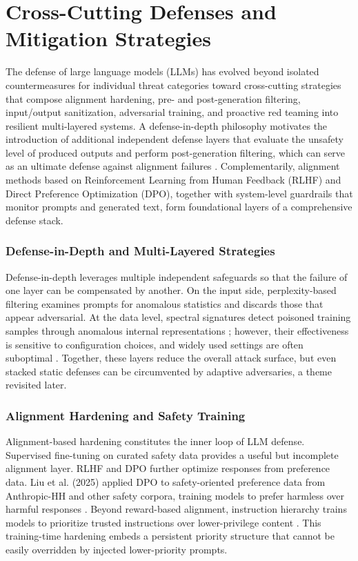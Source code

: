 \documentclass[11pt,a4paper]{article}
\begin{document}
\section{Cross-Cutting Defenses and Mitigation Strategies}

The defense of large language models (LLMs) has evolved beyond isolated countermeasures for individual threat categories toward cross-cutting strategies that compose alignment hardening, pre- and post-generation filtering, input/output sanitization, adversarial training, and proactive red teaming into resilient multi-layered systems. A defense-in-depth philosophy motivates the introduction of additional independent defense layers that evaluate the unsafety level of produced outputs and perform post-generation filtering, which can serve as an ultimate defense against alignment failures \cite{Arazzi_2026_Securebreak_0e3adcf7}. Complementarily, alignment methods based on Reinforcement Learning from Human Feedback (RLHF) and Direct Preference Optimization (DPO), together with system-level guardrails that monitor prompts and generated text, form foundational layers of a comprehensive defense stack.

\subsubsection{Defense-in-Depth and Multi-Layered Strategies}

Defense-in-depth leverages multiple independent safeguards so that the failure of one layer can be compensated by another. On the input side, perplexity-based filtering examines prompts for anomalous statistics and discards those that appear adversarial. At the data level, spectral signatures detect poisoned training samples through anomalous internal representations \cite{Tran_2018_SpectralSignatures}; however, their effectiveness is sensitive to configuration choices, and widely used settings are often suboptimal \cite{Le_2025_Signature_fc7a3218}. Together, these layers reduce the overall attack surface, but even stacked static defenses can be circumvented by adaptive adversaries, a theme revisited later.

\subsubsection{Alignment Hardening and Safety Training}

Alignment-based hardening constitutes the inner loop of LLM defense. Supervised fine-tuning on curated safety data provides a useful but incomplete alignment layer. RLHF and DPO further optimize responses from preference data. Liu et al. (2025) applied DPO to safety-oriented preference data from Anthropic-HH and other safety corpora, training models to prefer harmless over harmful responses \cite{Liu_2025_LLM_27335912}. Beyond reward-based alignment, instruction hierarchy trains models to prioritize trusted instructions over lower-privilege content \cite{Wallace_2024_InstructionHierarchy}. This training-time hardening embeds a persistent priority structure that cannot be easily overridden by injected lower-priority prompts.
\end{document}
